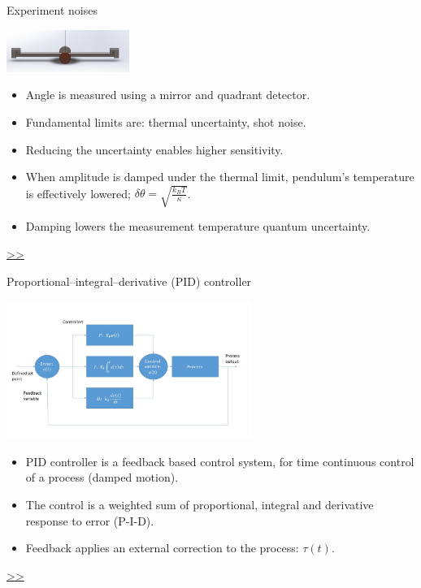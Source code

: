 \documentclass{beamer}
\begin{document}
\begin{frame}{\hypertarget{frame:Experiment noises}{Experiment noises}}
	\begin{center}		
		\includegraphics[width=0.3\textwidth,keepaspectratio]{pendulum_front.png}
    \end{center}
	\begin{itemize}
		
		\item Angle is measured using a mirror and quadrant detector.
		\item Fundamental limits are: thermal uncertainty, shot noise. 
		\item Reducing the uncertainty enables higher sensitivity.
		\item When amplitude is damped under the thermal limit, pendulum's temperature is effectively lowered; $\delta\theta = \sqrt{\frac{k_B T}{\kappa}}$. 
		\item Damping lowers the measurement temperature quantum uncertainty.

		
	\end{itemize}
	\hyperlink{frame:Experiment noises 1}{>>} 
\end{frame}

\begin{frame}{\hypertarget{frame:Proportional–integral–derivative (PID) controller}{Proportional–integral–derivative (PID) controller}}
	\begin{center}		
		\includegraphics[width=0.6\textwidth,keepaspectratio]{pid_diagram_powerpoint.jpg}
    \end{center}
	\begin{itemize}	
		\item PID controller is a feedback based control system, for time continuous control of a process (damped motion).
		\item The control is a weighted sum of proportional, integral and derivative response to error (P-I-D).
		\item Feedback applies an external correction to the process: $\tau(t)$.	
	\end{itemize}
	\hyperlink{frame:Proportional–integral–derivative (PID) controller 1}{>>} 
\end{frame}
\end{document}
